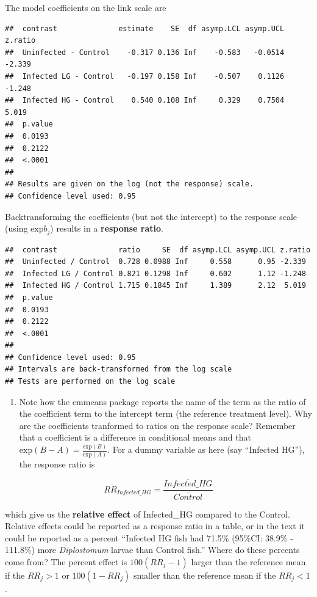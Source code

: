 \documentclass[]{book}
\providecommand{\tightlist}{%
  \setlength{\itemsep}{0pt}\setlength{\parskip}{0pt}}
\begin{document}
The model coefficients on the link scale are

\begin{verbatim}
##  contrast              estimate    SE  df asymp.LCL asymp.UCL z.ratio
##  Uninfected - Control    -0.317 0.136 Inf    -0.583   -0.0514 -2.339 
##  Infected LG - Control   -0.197 0.158 Inf    -0.507    0.1126 -1.248 
##  Infected HG - Control    0.540 0.108 Inf     0.329    0.7504  5.019 
##  p.value
##  0.0193 
##  0.2122 
##  <.0001 
## 
## Results are given on the log (not the response) scale. 
## Confidence level used: 0.95
\end{verbatim}

Backtransforming the coefficients (but not the intercept) to the response scale (using \(\mathrm{exp}{b_j}\)) results in a \textbf{response ratio}.

\begin{verbatim}
##  contrast              ratio     SE  df asymp.LCL asymp.UCL z.ratio
##  Uninfected / Control  0.728 0.0988 Inf     0.558      0.95 -2.339 
##  Infected LG / Control 0.821 0.1298 Inf     0.602      1.12 -1.248 
##  Infected HG / Control 1.715 0.1845 Inf     1.389      2.12  5.019 
##  p.value
##  0.0193 
##  0.2122 
##  <.0001 
## 
## Confidence level used: 0.95 
## Intervals are back-transformed from the log scale 
## Tests are performed on the log scale
\end{verbatim}

\begin{enumerate}
\def\labelenumi{\arabic{enumi}.}
\tightlist
\item
  Note how the emmeans package reports the name of the term as the ratio of the coefficient term to the intercept term (the reference treatment level). Why are the coefficients tranformed to ratios on the response scale? Remember that a coefficient is a difference in conditional means and that \(\mathrm{exp}(B-A) = \frac{\mathrm{exp}(B)}{\mathrm{exp}(A)}\). For a dummy variable as here (say ``Infected HG''), the response ratio is
\end{enumerate}

\begin{equation}
RR_{Infected\_HG} = \frac{\overline{Infected\_HG}}{\overline{Control}}
\end{equation}

which give us the \textbf{relative effect} of Infected\_HG compared to the Control. Relative effects could be reported as a response ratio in a table, or in the text it could be reported as a percent ``Infected HG fish had 71.5\% (95\%CI: 38.9\% - 111.8\%) more \emph{Diplostomum} larvae than Control fish.'' Where do these percents come from? The percent effect is \(100(RR_j - 1)\) larger than the reference mean if the \(RR_j > 1\) or \(100(1 - RR_j)\) smaller than the reference mean if the \(RR_j < 1\).
\end{document}
